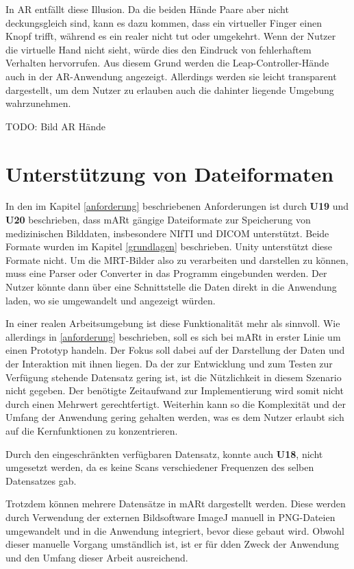 In AR entfällt diese Illusion. Da die beiden Hände Paare aber nicht deckungsgleich sind, kann es dazu kommen, dass ein virtueller Finger einen Knopf trifft, während es ein realer nicht tut oder umgekehrt. Wenn der Nutzer die virtuelle Hand nicht sieht, würde dies den Eindruck von fehlerhaftem Verhalten hervorrufen. 
Aus diesem Grund werden die Leap-Controller-Hände auch in der AR-Anwendung angezeigt. Allerdings werden sie leicht transparent dargestellt, um dem Nutzer zu erlauben auch die dahinter liegende Umgebung wahrzunehmen. 

TODO: 
Bild AR Hände


\section{Unterstützung von Dateiformaten} 

In den im Kapitel \ref{anforderung} beschriebenen Anforderungen ist durch \textbf{U19} und \textbf{U20} beschrieben, dass mARt gängige Dateiformate zur Speicherung von medizinischen Bilddaten, insbesondere NIfTI und DICOM unterstützt. Beide Formate wurden im Kapitel \ref{grundlagen} beschrieben. 
Unity unterstützt diese Formate nicht. Um die MRT-Bilder also zu verarbeiten und darstellen zu können, muss eine Parser oder Converter in das Programm eingebunden werden. 
Der Nutzer könnte dann über eine Schnittstelle die Daten direkt in die Anwendung laden, wo sie umgewandelt und angezeigt würden. 

In einer realen Arbeitsumgebung ist diese Funktionalität mehr als sinnvoll. Wie allerdings in \ref{anforderung} beschrieben, soll es sich bei mARt in erster Linie um einen Prototyp handeln.
Der Fokus soll dabei auf der Darstellung der Daten und der Interaktion mit ihnen liegen. Da der zur Entwicklung und zum Testen zur Verfügung stehende Datensatz gering ist, ist die Nützlichkeit in diesem Szenario nicht gegeben. Der benötigte Zeitaufwand zur Implementierung wird somit nicht durch einen Mehrwert gerechtfertigt.
Weiterhin kann so die Komplexität und der Umfang der Anwendung gering gehalten werden, was es dem Nutzer erlaubt sich auf die Kernfunktionen zu konzentrieren. 

Durch den eingeschränkten verfügbaren Datensatz, konnte auch \textbf{U18}, nicht umgesetzt werden, da es keine Scans verschiedener Frequenzen des selben Datensatzes gab.

Trotzdem können mehrere Datensätze in mARt dargestellt werden. Diese werden durch Verwendung der externen Bildsoftware ImageJ manuell in PNG-Dateien umgewandelt und in die Anwendung integriert, bevor diese gebaut wird. 
Obwohl dieser manuelle Vorgang umständlich ist, ist er für dden Zweck der Anwendung und den Umfang dieser Arbeit ausreichend.
